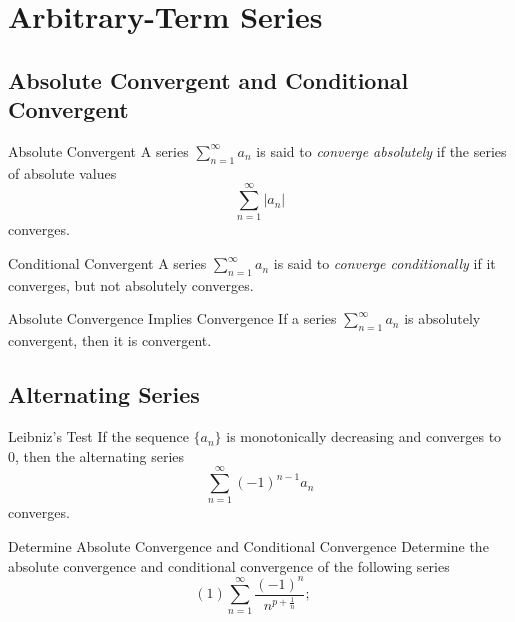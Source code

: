 \section{Arbitrary-Term Series}

\subsection{Absolute Convergent and Conditional Convergent}

\begin{definition}{Absolute Convergent}{}
  A series $\sum\limits_{n = 1}^{\infty}a_n$ is said to \emph{converge absolutely}
  if the series of absolute values
  \begin{equation}
    \sum\limits_{n = 1}^{\infty} |a_n|
  \end{equation}
  converges.
\end{definition}

\begin{definition}{Conditional Convergent}{}
  A series $\sum\limits_{n = 1}^{\infty}a_n$ is said to \emph{converge conditionally}
  if it converges, but not absolutely converges.
\end{definition}

\begin{proposition}{Absolute Convergence Implies Convergence}{}
  If a series $\sum\limits_{n = 1}^{\infty} a_n$ is absolutely convergent,
  then it is convergent.
\end{proposition}

\subsection{Alternating Series}

\begin{theorem}{Leibniz's Test}{}
  If the sequence $\{a_n\}$ is monotonically decreasing and converges to $0$,
  then the alternating series
  \begin{equation}
    \sum\limits_{n = 1}^{\infty}(-1)^{n-1}a_n
  \end{equation}
  converges.
\end{theorem}

\begin{example}{Determine Absolute Convergence and Conditional Convergence}{}
  Determine the absolute convergence and conditional convergence of the
  following series
  \begin{equation}
    (1) \sum\limits_{n = 1}^{\infty} \frac{(-1)^n}{n^{p+\frac{1}{n}}}; \quad
  \end{equation}
\end{example}

